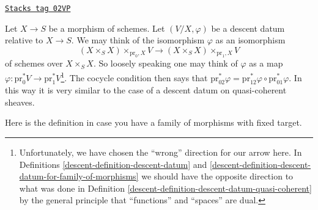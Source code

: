 \begin{remark}[Easier]
\label{descent-remark-easier}
\href{https://stacks.math.columbia.edu/tag/02VP}{\texttt{Stacks tag 02VP}}

Let $X \to S$ be a morphism of schemes. Let $(V/X, \varphi)$ be
a descent datum relative to $X \to S$. We may think of the
isomorphism $\varphi$ as an isomorphism
$$
(X \times_S X) \times_{\text{pr}_0, X} V
\longrightarrow
(X \times_S X) \times_{\text{pr}_1, X} V
$$
of schemes over $X \times_S X$. So loosely speaking one may
think of $\varphi$ as a map
$\varphi : \text{pr}_0^*V \to \text{pr}_1^*V$\footnote{Unfortunately,
we have chosen the ``wrong'' direction for our arrow here. In
Definitions \ref{descent-definition-descent-datum} and
\ref{descent-definition-descent-datum-for-family-of-morphisms}
we should have the opposite direction to what was done in
Definition \ref{descent-definition-descent-datum-quasi-coherent}
by the general principle that ``functions'' and ``spaces'' are dual.}.
The cocycle condition then says that
$\text{pr}_{02}^*\varphi =
\text{pr}_{12}^*\varphi \circ \text{pr}_{01}^*\varphi$.
In this way it is very similar to the case of a descent datum on
quasi-coherent sheaves.
\end{remark}

Here is the definition in case you have a family of morphisms
with fixed target.

